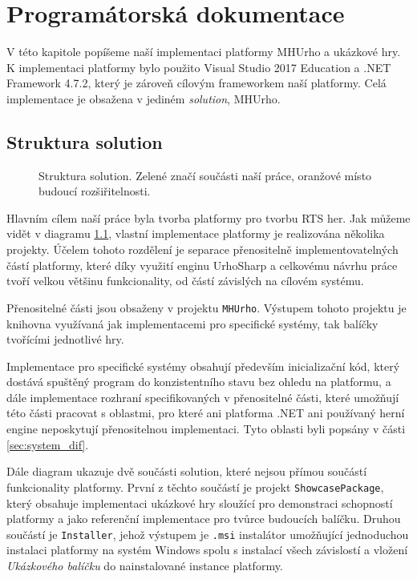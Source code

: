 \chapter{Programátorská dokumentace}
V této kapitole popíšeme naší implementaci platformy MHUrho a ukázkové hry. K implementaci platformy bylo použito Visual Studio 2017 Education a .NET Framework 4.7.2, který je zároveň cílovým frameworkem naší platformy. Celá implementace je obsažena v jediném \textit{solution}, MHUrho. 

\section{Struktura solution}

\begin{figure}[h]
	\centering
	\fontsize{10pt}{11pt}\selectfont
	\def\svgwidth{0.9\textwidth}
	
	\caption{Struktura solution. Zelené značí součásti naší práce, oranžové místo budoucí rozšiřitelnosti.}
	\label{fig:solution_structure}
\end{figure}

Hlavním cílem naší práce byla tvorba platformy pro tvorbu RTS her. Jak můžeme vidět v diagramu \ref{fig:solution_structure}, vlastní implementace platformy je realizována několika projekty. Účelem tohoto rozdělení je separace přenositelně implementovatelných částí platformy, které díky využití enginu UrhoSharp a celkovému návrhu práce tvoří velkou většinu funkcionality, od částí závislých na cílovém systému. 

Přenositelné části jsou obsaženy v projektu \texttt{MHUrho}. Výstupem tohoto projektu je knihovna využívaná jak implementacemi pro specifické systémy, tak balíčky tvořícími jednotlivé hry. 

Implementace pro specifické systémy obsahují především inicializační kód, který dostává spuštěný program do konzistentního stavu bez ohledu na platformu, a dále implementace rozhraní specifikovaných v přenositelné části, které umožňují této části pracovat s oblastmi, pro které ani platforma .NET ani používaný herní engine neposkytují přenositelnou implementaci. Tyto oblasti byli popsány v části \ref{sec:system_dif}.

Dále diagram ukazuje dvě součásti solution, které nejsou přímou součástí funkcionality platformy. První z těchto součástí je projekt \texttt{ShowcasePackage}, který obsahuje implementaci ukázkové hry sloužící pro demonstraci schopností platformy a jako referenční implementace pro tvůrce budoucích balíčku. Druhou součástí je \texttt{Installer}, jehož výstupem je \texttt{.msi} instalátor umožňující jednoduchou instalaci platformy na systém Windows spolu s instalací všech závislostí a vložení \textit{Ukázkového balíčku} do nainstalované instance platformy.

